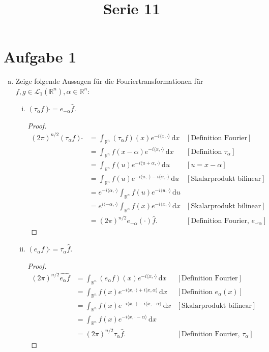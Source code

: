 \documentclass[10pt]{article}\usepackage[]{graphicx}\usepackage[]{color}
\title{Serie 11}
\date{}
\author{}
\newcommand{\R}{\mathbb{R}}
\newcommand{\df}{\,\textrm{d}}
\begin{document}
\maketitle

\section*{Aufgabe 1}
\begin{enumerate}[(a)]
\item Zeige folgende Aussagen für die Fouriertransformationen
für $f,g \in \mathscr{L}_1(\R^n), \alpha \in \R^n$:
\begin{enumerate}[(i)]
  \item $(\tau_\alpha f)\widehat{} = e_{-\alpha}\widehat{f}$.
  \begin{proof}
      \begin{align*}
        (2\pi)^{n/2} (\tau_\alpha f)~\widehat{}
        &= \int_{\R^n} (\tau_\alpha f)(x) e^{-i\langle x, \cdot \rangle} \df x & [\textrm{Definition Fourier}]\\
        &= \int_{\R^n} f(x - \alpha) e^{-i\langle x, \cdot \rangle} \df x & [\textrm{Definition $\tau_\alpha$}]\\
        &= \int_{\R^n} f(u) e^{-i \langle u + \alpha, \cdot \rangle} \df u & [u = x - \alpha]\\
        &= \int_{\R^n} f(u) e^{-i \langle u, \cdot \rangle -i\langle \alpha , \cdot \rangle} \df u & [\textrm{Skalarprodukt bilinear}]\\
        &= e^{-i\langle \alpha, \cdot \rangle} \int_{\R^n} f(u) e^{-i \langle u, \cdot \rangle} \df u & \\
        &= e^{i\langle -\alpha, \cdot\rangle} \int_{\R^n} f(x) e^{-i \langle x, \cdot \rangle} \df x & [\textrm{Skalarprodukt bilinear}]\\
        &= (2\pi)^{n/2} e_{-\alpha}(\cdot)\widehat{f}. &  [\textrm{Definition Fourier, $e_{-\alpha}$}].
      \end{align*}
      \end{proof}
      
  \item $(e_\alpha f)\widehat{} = \tau_\alpha \widehat{f}$.
  \begin{proof}
\begin{align*}
  (2\pi)^{n/2} \widehat{e_\alpha f}
  &= \int_{\R^n} (e_\alpha f)(x) e^{-i\langle x, \cdot\rangle} \df x & [\textrm{Definition Fourier}] \\
  &= \int_{\R^n} f(x) e^{-i\langle x, \cdot\rangle + i\langle x, \alpha\rangle} \df x & [\textrm{Definition $e_\alpha(x)$}] \\
  &= \int_{\R^n} f(x) e^{-i\langle x, \cdot\rangle - i\langle x, -\alpha\rangle} \df x & [\textrm{Skalarprodukt bilinear}] \\
  &= \int_{\R^n} f(x) e^{-i\langle x, \cdot - \alpha\rangle} \df x &  \\
  &= (2\pi)^{n/2} \tau_{\alpha} \widehat{f}. & [\textrm{Definition Fourier, $\tau_\alpha$}]
\end{align*}
\end{proof}
  

\end{enumerate}
\end{enumerate}
\end{document}
